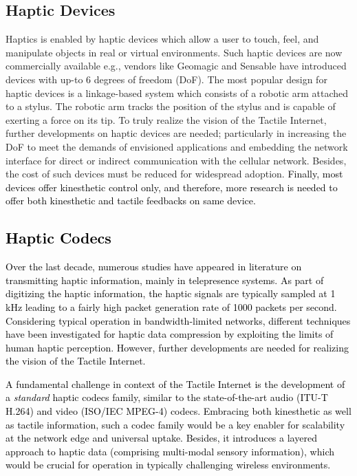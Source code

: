 \documentclass[journal]{IEEEtran}
\begin{document}
\subsection{Haptic Devices}
Haptics is enabled by haptic devices which allow a user to touch, feel, and manipulate objects in real or virtual environments. Such haptic devices are now commercially available e.g., vendors like Geomagic and Sensable have introduced devices with up-to 6 degrees of freedom (DoF). The most popular design for haptic devices is a linkage-based  system which consists of a robotic arm attached to a stylus. The robotic arm tracks the position of the stylus and is capable of exerting a force on its tip. To truly realize the vision of the Tactile Internet, further developments on haptic devices are needed; particularly in increasing the DoF to meet the demands of envisioned applications and embedding the network interface for direct or indirect communication with the cellular network. Besides, the cost of such devices must be reduced for widespread adoption. \textcolor{black}{Finally, most devices offer kinesthetic control only, and therefore, more research is needed to offer both kinesthetic and tactile feedbacks on same device.}

\subsection{\textcolor{black}{Haptic Codecs}}
\textcolor{black}{Over the last decade, numerous studies have appeared in literature on transmitting haptic information, mainly in telepresence systems. As part of digitizing the haptic information, the haptic signals are typically sampled at 1 kHz leading to a fairly high packet generation rate of 1000 packets per second. Considering typical operation in bandwidth-limited networks, different techniques have been investigated for haptic data compression by exploiting the limits of human haptic perception.  However, further developments are needed for realizing the vision of the Tactile Internet.}

\textcolor{black}{A fundamental challenge in context of the Tactile Internet is the development of a \emph{standard} haptic codecs family, similar to the state-of-the-art audio (ITU-T H.264) and video (ISO/IEC MPEG-4) codecs. Embracing both kinesthetic as well as tactile information, such a codec family would be a key enabler for scalability at the network edge and universal uptake. Besides, it introduces a layered approach to haptic data (comprising multi-modal sensory information), which would be crucial for operation in typically challenging wireless environments.}
\end{document}
